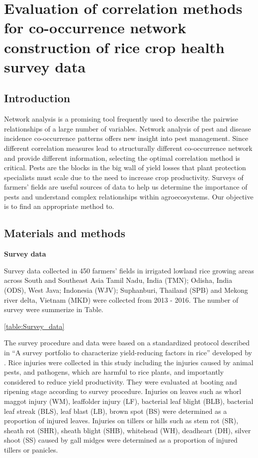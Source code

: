 \section{Evaluation of correlation methods for co-occurrence network construction of rice crop health survey data}

\subsection*{Introduction}

Network analysis is a promising tool frequently used to describe the pairwise relationships of a large number of variables. Network analysis of pest and disease incidence co-occurrence patterns offers new insight into pest management. Since different correlation measures lead to structurally different co-occurrence network and provide different information, selecting the optimal correlation method is critical. Pests are the blocks in the big wall of yield losses that plant protection specialists must scale due to the need to increase crop productivity. Surveys of farmers’ fields are useful sources of data to help us determine the importance of pests and understand complex relationships within agroecosystems. Our objective is to find an appropriate method to.

% 

\subsection*{Materials and methods}
\textbf{Survey data}

Survey data collected in 450 farmers’ fields in irrigated lowland rice growing areas across South and Southeast Asia Tamil Nadu, India (TMN); Odisha, India (ODS), West Java; Indonesia (WJV); Suphanburi, Thailand (SPB) and Mekong river delta, Vietnam (MKD) were collected from 2013 - 2016. The number of survey were summerize in Table.

\ref{table:Survey_data}

The survey procedure and data were based on a standardized protocol described in ``A survey portfolio to characterize yield-reducing factors in rice'' developed by \citet{Savary_2009_Survey}. Rice injuries were collected in this study including the injuries caused by animal pests, and pathogens, which are harmful to rice plants, and importantly considered to reduce yield productivity. They were evaluated at booting and ripening stage according to survey procedure. Injuries on leaves such as whorl maggot injury (WM), leaffolder injury (LF), bacterial leaf blight (BLB), bacterial leaf streak (BLS), leaf blast (LB), brown spot (BS) were determined as a proportion of injured leaves. Injuries on tillers or hills such as stem rot (SR), sheath rot (SHR), sheath blight (SHB), whitehead (WH), deadheart (DH), silver shoot (SS) caused by gall midges were determined as a proportion of injured tillers or panicles.

